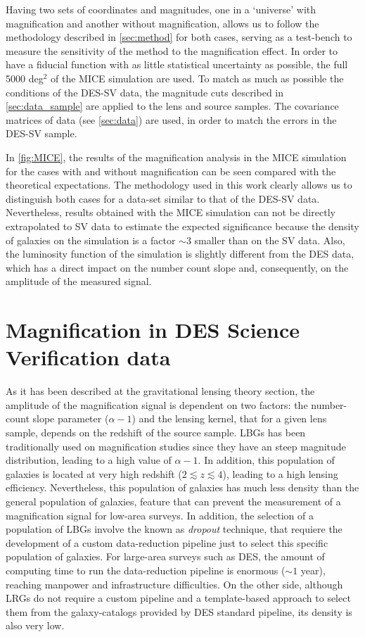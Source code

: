 Having two sets of coordinates and magnitudes, one in a `universe' with magnification and another without magnification, allows us to follow the methodology described in \autoref{sec:method} for both cases,
serving as a test-bench to measure the sensitivity of the method to the magnification effect. In order to have a fiducial function with as little statistical uncertainty as possible, the full 5000 deg$^2$ of the MICE simulation are used. To match as much as possible the conditions of the DES-SV data, the magnitude cuts described in \autoref{sec:data_sample} are applied to the lens and source samples. The covariance matrices of data (see \autoref{sec:data}) are used, in order to match the errors in the DES-SV sample.

In \autoref{fig:MICE}, the results of the magnification analysis in the MICE simulation for the cases with and without magnification can be seen compared with the theoretical expectations. The methodology used in this work clearly allows us to distinguish both cases for a data-set similar to that of the DES-SV data. Nevertheless, results obtained with the MICE simulation can not be directly extrapolated to SV data to estimate the expected significance because the density of galaxies on the simulation is a factor $\sim3$ smaller than on the SV data. Also, the luminosity function of the simulation is slightly different from the DES data, which has a direct impact on the number count slope and, consequently, on the amplitude of the measured signal.


\section{Magnification in DES Science Verification data}
\label{sec:svdata}
As it has been described at the gravitational lensing theory section, the amplitude of the magnification signal is dependent on two factors: the number-count slope parameter ($\alpha-1$) and the lensing kernel, that for a given lens sample, depends on the redshift of the source sample. LBGs has been traditionally used on magnification studies since they have an steep magnitude distribution, leading to a high value of $\alpha-1$. In addition, this population of galaxies is located at very high redshift ($2\lesssim z\lesssim 4$), leading to a high lensing efficiency. Nevertheless, this population of galaxies has much less density than the general population of galaxies, feature that can prevent the measurement of a magnification signal for low-area surveys. In addition, the selection of a population of LBGs involve the known as {\it dropout} technique, that requiere the development of a custom data-reduction pipeline just to select this specific population of galaxies. For large-area surveys such as DES, the amount of computing time to run the data-reduction pipeline is enormous ($\sim 1$ year), reaching manpower and infrastructure difficulties. On the other side, although LRGs do not require a custom pipeline and a template-based approach to select them from the galaxy-catalogs provided by DES standard pipeline, its density is also very low.
\newline

